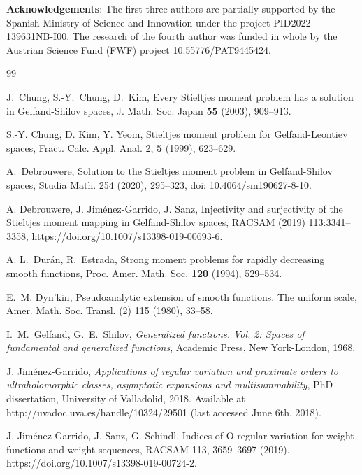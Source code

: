 \documentclass[12pt,a4paper]{article}
\theoremstyle{plain}
\theoremstyle{definition}
\numberwithin{equation}{section}
\begin{document}
\noindent\textbf{Acknowledgements}: The first three authors are partially supported by the Spanish Ministry of Science and Innovation under the project PID2022-139631NB-I00. The research of the fourth author was funded in whole by the Austrian Science Fund (FWF) project 10.55776/PAT9445424.\par

\begin{thebibliography}{99}
\setlength{\itemsep}{0pt}

 J.~Chung, S.-Y.~Chung, D.~Kim, Every Stieltjes moment problem has a solution in Gelfand-Shilov spaces, J. Math. Soc. Japan  {\bf{55}} (2003), 909--913.

 S.-Y. Chung, D. Kim, Y. Yeom, Stieltjes moment problem for Gelfand-Leontiev spaces, Fract. Calc. Appl. Anal. 2, {\bf 5} (1999), 623--629.

A.~Debrouwere, Solution to the {S}tieltjes moment problem in {G}elfand-{S}hilov spaces, Studia Math. 254 (2020), 295--323, doi: 10.4064/sm190627-8-10.

 A. Debrouwere, J. Jim\'enez-Garrido, J. Sanz, Injectivity and surjectivity of the Stieltjes moment mapping in Gelfand-Shilov spaces, RACSAM (2019) 113:3341--3358,
https://doi.org/10.1007/s13398-019-00693-6.

 A. L.~Dur\'an, R.~Estrada, Strong moment problems for rapidly decreasing smooth functions, Proc. Amer. Math. Soc.  {\bf{120}} (1994), 529--534.

E.~M. Dyn'kin, Pseudoanalytic extension of smooth functions. {T}he uniform scale,
Amer. Math. Soc. Transl. (2) 115 (1980), 33--58.

 I.~M.~Gelfand, G.~E.~Shilov, \emph{Generalized functions. Vol. 2: Spaces of fundamental and generalized
functions}, Academic Press, New York-London, 1968.

 J. Jim\'enez-Garrido, \emph{Applications of regular variation and proximate orders to ultraholomorphic classes, asymptotic expansions and multisummability}, PhD dissertation, University of Valladolid, 2018. Available at http://uvadoc.uva.es/handle/10324/29501 (last accessed June 6th, 2018).

 J. Jim\'enez-Garrido, J. Sanz, G. Schindl, Indices of O-regular variation for weight functions and weight sequences,  RACSAM 113, 3659--3697 (2019). https://doi.org/10.1007/s13398-019-00724-2.


\end{thebibliography}
\end{document}
